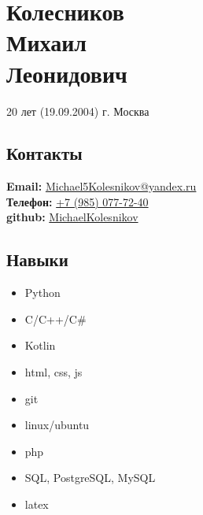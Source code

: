 \documentclass[14pt]{extarticle}
\begin{document}
\noindent
\begin{minipage}{0.35\textwidth} %
      \section*{Колесников \\ Михаил \\ Леонидович}
      20 лет (19.09.2004)
      г. Москва
      \vspace{2cm}
      \subsection*{Контакты}
      \textbf{Email:} \href{mailto:Michael5Kolesnikov@yandex.ru}{Michael5Kolesnikov@yandex.ru} \\
      \textbf{Телефон:} \href{tel:+79850777240}{+7 (985) 077-72-40} \\
      \textbf{github:} \href{https://github.com/MichaelKolesnikov}{MichaelKolesnikov} \\

      \vspace{2cm}

      \subsection*{Навыки}
      \begin{itemize}
            \item Python
            \item C/C++/C\#
            \item Kotlin
            \item html, css, js
            \item git
            \item linux/ubuntu
            \item php
            \item SQL, PostgreSQL, MySQL
            \item latex
      \end{itemize}

\end{minipage}
\hfill
\vline %
\hfill
\end{document}
